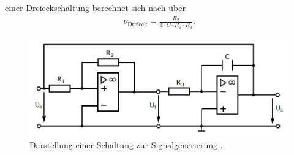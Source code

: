 einer Dreieckschaltung berechnet sich nach \cite{sample} über
\begin{align}
  \nu_\text{Dreieck} = \frac{R_2}{4 \cdot C \cdot R_1 \cdot R_3}.
  \label{eqn:10}
\end{align}
\FloatBarrier
\begin{figure}
  \centering
  \includegraphics[scale=0.8]{ressources/figure_07.png}
  \caption{Darstellung einer Schaltung zur Signalgenerierung \cite{sample}.}
  \label{fig:07}
\end{figure}
\FloatBarrier
